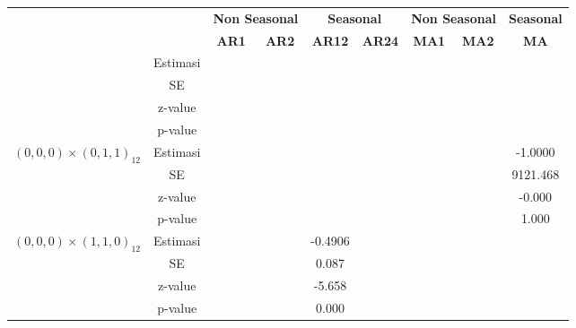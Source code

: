 \begin{enumerate}[label=\alph*.]
\begin{longtable}{|c|c|c|c|c|c|c|c|c|}
            & &
            \multicolumn{2}{c|}{\textbf{Non Seasonal}} &
            \multicolumn{2}{c|}{\textbf{Seasonal}} &
            \multicolumn{2}{c|}{\textbf{Non Seasonal}} &
            \textbf{Seasonal} \\ \cline{3-9}

            & &
            \textbf{AR1} & \textbf{AR2} &
            \textbf{AR12} & \textbf{AR24} &
            \textbf{MA1} & \textbf{MA2} &
            \textbf{MA} \\ \hline
            \endhead

            \hline
            \endfoot

            \hline
            \endlastfoot


            \hline
            \multirow{4}{*}{$(0,0,0)\times(0,1,0)_{12}$}
            & Estimasi & {} & {} & {} & {} & {} & {} & {} \\ \cline{2-9}
            & SE       & {} & {} & {} & {} & {} & {} & {}\\ \cline{2-9}
            & z-value  &  {}   & {} & {} & {} & {} & {} & {} \\ \cline{2-9}
            & p-value  & {} & {} & {} & {} & {} & {} & {} \\ \hline

            \multirow{4}{*}{$(0,0,0)\times(0,1,1)_{12}$}
            & Estimasi & {} & {} & {} & {} & {} & {} & -1.0000 \\ \cline{2-9}
            & SE       & {} & {} & {} & {} & {} & {} & 9121.468\\ \cline{2-9}
            & z-value  &  {}   & {} & {} & {} & {} & {} & -0.000 \\ \cline{2-9}
            & p-value  & {} & {} & {} & {} & {} & {} & 1.000 \\ \hline

            \multirow{4}{*}{$(0,0,0)\times(1,1,0)_{12}$}
            & Estimasi & {} & {} & -0.4906 & {} & {} & {} & {} \\ \cline{2-9}
            & SE       & {} & {} & 0.087 & {} & {} & {} & {}\\ \cline{2-9}
            & z-value  & {} & {} & -5.658 & {} & {} & {} & {}\\ \cline{2-9}
            & p-value  & {} & {} & 0.000 & {} & {} & {} & {}\\ \hline


\end{longtable}
\end{enumerate}
